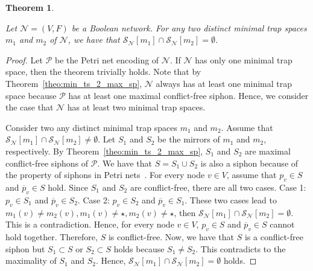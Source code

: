 \documentclass[preprint,12pt]{elsarticle}
\newtheorem{theorem}{Theorem}[section]
\begin{document}
\begin{theorem}%
\label{theo:separation_min_ts}

  Let \(\mathcal{N} = (V, F)\) be a Boolean network.
  For any two distinct minimal trap spaces \(m_1\) and \(m_2\) of \(\mathcal{N}\), we have that \(\mathcal{S}_{\mathcal{N}}[m_1] \cap \mathcal{S}_{\mathcal{N}}[m_2] = \emptyset\).

\end{theorem}

\begin{proof}

  Let \(\mathcal{P}\) be the Petri net encoding of \(\mathcal{N}\).
  If \(\mathcal{N}\) has only one minimal trap space, then the theorem trivially holds.
  Note that by Theorem~\ref{theo:min_ts_2_max_sp}, \(\mathcal{N}\) always has at least one minimal trap space because \(\mathcal{P}\) has at least one maximal conflict-free siphon.
  Hence, we consider the case that \(\mathcal{N}\) has at least two minimal trap spaces.

  Consider two any distinct minimal trap spaces \(m_1\) and \(m_2\).
  Assume that \(\mathcal{S}_{\mathcal{N}}[m_1] \cap \mathcal{S}_{\mathcal{N}}[m_2] \neq \emptyset\).
  Let \(S_1\) and \(S_2\) be the mirrors of \(m_1\) and \(m_2\), respectively.
  By Theorem~\ref{theo:min_ts_2_max_sp}, \(S_1\) and \(S_2\) are maximal conflict-free siphons of \(\mathcal{P}\).
  We have that \(S = S_1 \cup S_2\) is also a siphon because of the property of siphons in Petri nets~\cite{DBLP:journals/isci/LiuB16}.
  For every node \(v \in V\), assume that \(p_v \in S\) and \(\overline{p}_v \in S\) hold.
  Since \(S_1\) and \(S_2\) are conflict-free, there are all two cases.
  Case 1: \(p_v \in S_1\) and \(\overline{p}_v \in S_2\).
  Case 2: \(p_v \in S_2\) and \(\overline{p}_v \in S_1\).
  These two cases lead to \(m_1(v) \neq m_2(v), m_1(v) \neq \star, m_2(v) \neq \star\), then  \(\mathcal{S}_{\mathcal{N}}[m_1] \cap \mathcal{S}_{\mathcal{N}}[m_2] = \emptyset\).
  This is a contradiction.
  Hence, for every node \(v \in V\), \(p_v \in S\) and \(\overline{p}_v \in S\) cannot hold together.
  Therefore, \(S\) is conflict-free.
  Now, we have that \(S\) is a conflict-free siphon but \(S_1 \subset S\) or \(S_2 \subset S\) holds because \(S_1 \neq S_2\).
  This contradicts to the maximality of \(S_1\) and \(S_2\).
  Hence, \(\mathcal{S}_{\mathcal{N}}[m_1] \cap \mathcal{S}_{\mathcal{N}}[m_2] = \emptyset\) holds.
  
\end{proof}
\end{document}
